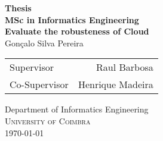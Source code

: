 \begin{titlepage}

\begin{center}

\textup{\small {\bf Thesis}}\\[0.3in]

\small{\bf MSc in Informatics Engineering}\\[1.3in]

\Large 
\textbf{Evaluate the robusteness of Cloud}\\[1.5in]

\Large{Gonçalo Silva Pereira}\\
\vspace{0.5cm}

\normalsize 
\begin{table}[h]
\centering
\begin{tabular}{lr}\hline
Supervisor     &  Raul Barbosa\\
Co-Supervisor  &  Henrique Madeira\\ \hline
\end{tabular}
\end{table}

\vspace{3cm}
\Large{Department of Informatics Engineering}\\
\normalsize
\textsc{University of Coimbra}
\vspace{0.2cm}\\


\dateenglish
\today

\end{center}
\end{titlepage}

